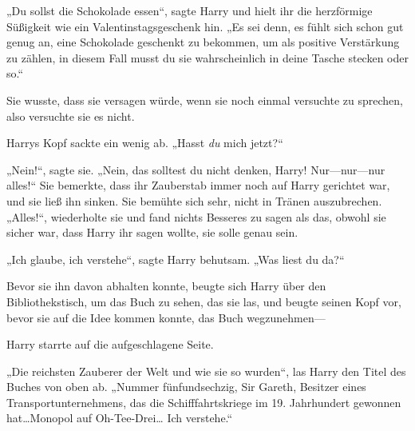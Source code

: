 „Du sollst die Schokolade essen“, sagte Harry und hielt ihr die herzförmige Süßigkeit wie ein Valentinstagsgeschenk hin. „Es sei denn, es fühlt sich schon gut genug an, eine Schokolade geschenkt zu bekommen, um als positive Verstärkung zu zählen, in diesem Fall musst du sie wahrscheinlich in deine Tasche stecken oder so.“

Sie wusste, dass sie versagen würde, wenn sie noch einmal versuchte zu sprechen, also versuchte sie es nicht.

Harrys Kopf sackte ein wenig ab. „Hasst \emph{du} mich jetzt?“

„Nein!“, sagte sie. „Nein, das solltest du nicht denken, Harry! Nur—nur—nur alles!“
Sie bemerkte, dass ihr Zauberstab immer noch auf Harry gerichtet war, und sie ließ ihn sinken. Sie bemühte sich sehr, nicht in Tränen auszubrechen.
„Alles!“, wiederholte sie und fand nichts Besseres zu sagen als das, obwohl sie sicher war, dass Harry ihr sagen wollte, sie solle genau sein.

„Ich glaube, ich verstehe“, sagte Harry behutsam. „Was liest du da?“

Bevor sie ihn davon abhalten konnte, beugte sich Harry über den Bibliothekstisch, um das Buch zu sehen, das sie las, und beugte seinen Kopf vor, bevor sie auf die Idee kommen konnte, das Buch wegzunehmen—

Harry starrte auf die aufgeschlagene Seite.

„Die reichsten Zauberer der Welt und wie sie so wurden“, las Harry den Titel des Buches von oben ab. „Nummer fünfundsechzig, Sir Gareth, Besitzer eines Transportunternehmens, das die Schifffahrtskriege im 19. Jahrhundert gewonnen hat…Monopol auf Oh-Tee-Drei… Ich verstehe.“

